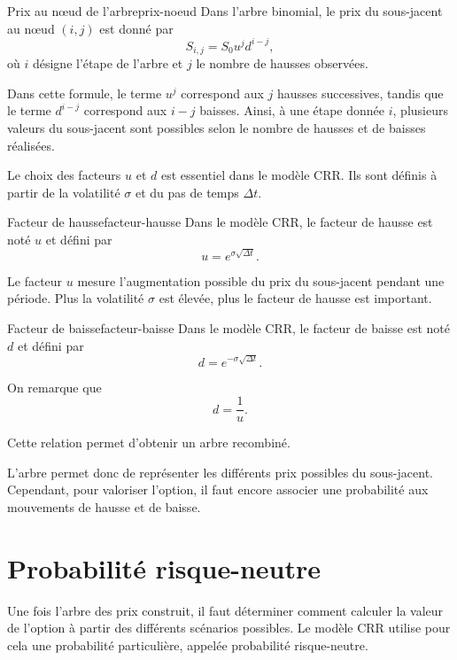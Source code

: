\documentclass[11pt]{report}
\begin{document}
\begin{definition}{Prix au nœud de l'arbre}{prix-noeud}
Dans l'arbre binomial, le prix du sous-jacent au nœud $(i,j)$ est donné par
\[
S_{i,j} = S_0 u^j d^{i-j},
\]
où $i$ désigne l'étape de l'arbre et $j$ le nombre de hausses observées.
\end{definition}

Dans cette formule, le terme $u^j$ correspond aux $j$ hausses successives, tandis que le terme $d^{i-j}$ correspond aux $i-j$ baisses. Ainsi, à une étape donnée $i$, plusieurs valeurs du sous-jacent sont possibles selon le nombre de hausses et de baisses réalisées.

Le choix des facteurs $u$ et $d$ est essentiel dans le modèle CRR. Ils sont définis à partir de la volatilité $\sigma$ et du pas de temps $\Delta t$.

\begin{definition}{Facteur de hausse}{facteur-hausse}
Dans le modèle CRR, le facteur de hausse est noté $u$ et défini par
\[
u = e^{\sigma\sqrt{\Delta t}}.
\]
\end{definition}

Le facteur $u$ mesure l'augmentation possible du prix du sous-jacent pendant une période. Plus la volatilité $\sigma$ est élevée, plus le facteur de hausse est important.

\begin{definition}{Facteur de baisse}{facteur-baisse}
Dans le modèle CRR, le facteur de baisse est noté $d$ et défini par
\[
d = e^{-\sigma\sqrt{\Delta t}}.
\]
\end{definition}

On remarque que
\[
d = \frac{1}{u}.
\]

Cette relation permet d'obtenir un arbre recombiné.

L'arbre permet donc de représenter les différents prix possibles du sous-jacent. Cependant, pour valoriser l'option, il faut encore associer une probabilité aux mouvements de hausse et de baisse.

\section{Probabilité risque-neutre}

Une fois l'arbre des prix construit, il faut déterminer comment calculer la valeur de l'option à partir des différents scénarios possibles. Le modèle CRR utilise pour cela une probabilité particulière, appelée probabilité risque-neutre.
\end{document}
